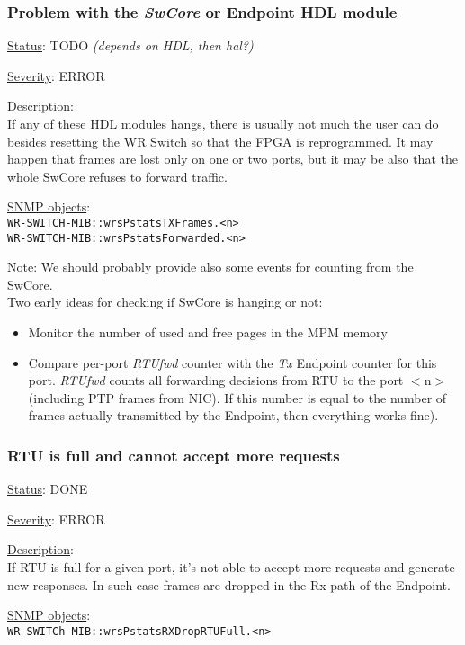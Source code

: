 \subsubsection{\bf Problem with the \emph{SwCore} or Endpoint HDL module}
		\label{fail:data:swcore_hang}
		\begin{packed_enum}
			\item [] \underline{Status}: TODO \emph{(depends on HDL, then hal?)}
			\item [] \underline{Severity}: ERROR
			\item [] \underline{Description}:\\
				If any of these HDL modules hangs, there is usually not much the user
				can do besides resetting the WR Switch so that the FPGA is reprogrammed.
				It may happen that frames are lost only on one or two ports, but it may
				be also that the whole SwCore refuses to forward traffic.
			\item [] \underline{SNMP objects}:\\
				\texttt{WR-SWITCH-MIB::wrsPstatsTXFrames.<n>}\\
				\texttt{WR-SWITCH-MIB::wrsPstatsForwarded.<n>}
			\item [] \underline{Note}: We should probably provide also some events for
				counting from the SwCore.\\
				Two early ideas for checking if SwCore is hanging or not:
				\begin{itemize}
					\item Monitor the number of used and free pages in the MPM memory
					\item Compare per-port \emph{RTUfwd} counter with the \emph{Tx}
						Endpoint counter for this port. \emph{RTUfwd} counts all forwarding
						decisions from RTU to the port $<$n$>$ (including PTP frames from
						NIC). If this number is equal to the number of frames actually
						transmitted by the Endpoint, then everything works fine).
				\end{itemize}
		\end{packed_enum}

\subsubsection{\bf RTU is full and cannot accept more requests}
		\label{fail:data:rtu_full}
		\begin{packed_enum}
			\item [] \underline{Status}: DONE
			\item [] \underline{Severity}: ERROR
			\item [] \underline{Description}:\\
				If RTU is full for a given port, it's not able to accept more requests
				and generate new responses. In such case frames are dropped in the
				Rx path of the Endpoint.
			\item [] \underline{SNMP objects}:\\
				\texttt{WR-SWITCh-MIB::wrsPstatsRXDropRTUFull.<n>}
		\end{packed_enum}

